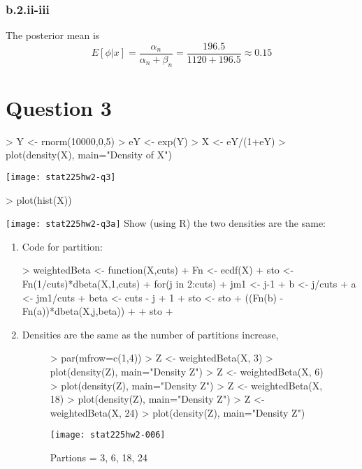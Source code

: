 \documentclass{article}
\begin{document}
\subsubsection*{b.2.ii-iii}
The posterior mean is 
$$ 
E [\phi|x] = \frac{\alpha_n}{\alpha_n + \beta_n} = \frac{196.5}{1120 + 196.5} \approx 0.15
$$
\newpage

\section*{Question 3}
\begin{Schunk}
\begin{Sinput}
> Y <- rnorm(10000,0,5)
> eY <- exp(Y)
> X <- eY/(1+eY)
> plot(density(X), main="Density of X")
\end{Sinput}
\end{Schunk}
\texttt{[image: stat225hw2-q3]}
\begin{Schunk}
\begin{Sinput}
> plot(hist(X))
\end{Sinput}
\end{Schunk}
\texttt{[image: stat225hw2-q3a]}
Show (using R) the two densities are the same:
\begin{enumerate}
\item Code for partition:
\begin{Schunk}
\begin{Sinput}
> weightedBeta <- function(X,cuts){
+   Fn <- ecdf(X)
+   sto <- Fn(1/cuts)*dbeta(X,1,cuts)
+   for(j in 2:cuts){
+     jm1 <- j-1
+     b <- j/cuts
+     a <- jm1/cuts
+     beta <- cuts - j + 1
+     sto <- sto + ((Fn(b) - Fn(a))*dbeta(X,j,beta))
+   }
+   sto
+ }
\end{Sinput}
\end{Schunk}
\item Densities are the same as the number of partitions increase,
\begin{figure}[H]
\centering
\begin{Schunk}
\begin{Sinput}
> par(mfrow=c(1,4))
> Z <- weightedBeta(X, 3)
> plot(density(Z), main="Density Z")
> Z <- weightedBeta(X, 6)
> plot(density(Z), main="Density Z")
> Z <- weightedBeta(X, 18)
> plot(density(Z), main="Density Z")
> Z <- weightedBeta(X, 24)
> plot(density(Z), main="Density Z")
\end{Sinput}
\end{Schunk}
\texttt{[image: stat225hw2-006]}
\caption{Partions = 3, 6, 18, 24}
\end{figure}
\end{enumerate}
\newpage 
\end{document}
